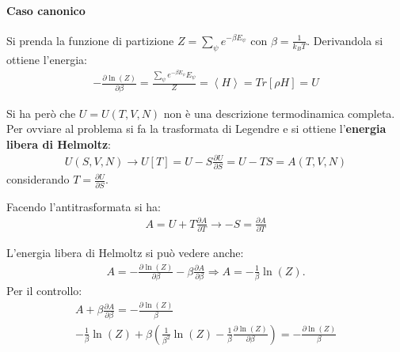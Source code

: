 \paragraph{Caso canonico} %
Si prenda la funzione di partizione $Z=\sum_{\psi }{e^{-\beta E_\psi }}$ con $\beta=\frac{1}{k_BT}$. Derivandola si ottiene l'energia:
\begin{equation}\begin{split}
-\frac{\partial \ln{\left(Z\right)}}{\partial \beta}=\frac{\sum_{\psi }{e^{-\beta E_\psi }E_\psi }}{Z}=\left\langle H \right\rangle=Tr\left[\rho H\right]=U
\end{split}\end{equation}

Si ha però che $U=U\left(T,V,N\right)$ non è una descrizione termodinamica completa. Per ovviare al problema si fa la trasformata di Legendre e si ottiene l'\textbf{energia libera di Helmoltz}:
\begin{equation}\begin{split}
U\left(S,V,N\right)\longrightarrow U\left[T\right]=U-S\frac{\partial U}{\partial S}=U-TS=A\left(T,V,N\right)
\end{split}\end{equation}
considerando $T=\frac{\partial U}{\partial S}$.

Facendo l'antitrasformata si ha:
\begin{equation}\begin{split}
A=U+T\frac{\partial A}{\partial T} \longrightarrow -S=\frac{\partial A}{\partial T}
\end{split}\end{equation}

L'energia libera di Helmoltz si può vedere anche:
\begin{equation}\begin{split}
A=-\frac{\partial \ln{\left(Z\right)}}{\partial \beta}-\beta\frac{\partial A}{\partial \beta} \Longrightarrow A=-\frac{1}{\beta}\ln{\left(Z\right)}.
\end{split}\end{equation}
Per il controllo:
\begin{equation}\begin{split}
A+\beta\frac{\partial A}{\partial \beta}=-\frac{\partial \ln{\left(Z\right)}}{\beta} \\
-\frac{1}{\beta}\ln{\left(Z\right)}+\beta\left(\frac{1}{\beta^2}\ln{\left(Z\right)}-\frac{1}{\beta}\frac{\partial \ln{\left(Z\right)}}{\partial \beta}\right)=-\frac{\partial \ln{\left(Z\right)}}{\beta}
\end{split}\end{equation}

